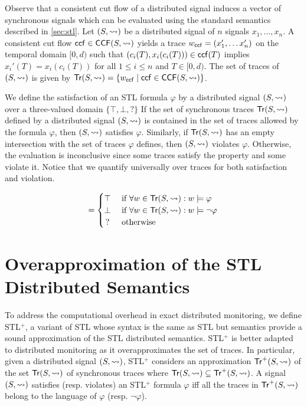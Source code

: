 Observe that a consistent cut flow of a distributed signal induces a vector of synchronous signals which can be evaluated using the standard semantics described in \cref{sec:stl}.
Let $(S,{\rightsquigarrow})$ be a distributed signal of $n$ signals $x_1, \ldots, x_n$.
A consistent cut flow $\mathsf{ccf} \in \mathsf{CCF}(S,{\rightsquigarrow})$ yields a trace $w_{\mathsf{ccf}} = (x'_1, \ldots x'_n)$ on the temporal domain $[0,d)$ such that $(c_i(T), x_i(c_i(T))) \in \mathsf{ccf}(T)$ implies $x_i'(T) = x_i(c_i(T))$ for all $1 \leq i \leq n$ and $T \in [0, d)$.
The set of traces of $(S,{\rightsquigarrow})$ is given by $\tr(S,{\hb}) = \{ w_{\ccf} \st \ccf \in \CCF(S,{\hb})\}$.

We define the satisfaction of an STL formula $\varphi$ by a distributed signal $(S,{\rightsquigarrow})$ over a three-valued domain $\{\top, \bot, {?}\}$
If the set of synchronous traces $\mathsf{Tr}(S,{\rightsquigarrow})$ defined by a distributed signal $(S,{\rightsquigarrow})$ is contained in the set of traces allowed by the formula $\varphi$, then $(S,{\rightsquigarrow})$ satisfies $\varphi$.
Similarly, if $\mathsf{Tr}(S,{\rightsquigarrow})$ has an empty intersection with the set of traces $\varphi$ defines, then $(S,{\rightsquigarrow})$ violates $\varphi$.
Otherwise, the evaluation is inconclusive since some traces satisfy the property and some violate it.
Notice that we quantify universally over traces for both satisfaction and violation.

\small
\begin{equation*}
	[(S,{\hb}) \models \varphi] = 
	\begin{cases}
		\top & \text{ if } \forall w \in \tr(S,{\hb}) : w \models \varphi \\
		\bot & \text{ if } \forall w \in \tr(S,{\hb}) : w \models \lnot\varphi \\
		\,? & \text{ otherwise}
	\end{cases}
\end{equation*}
\normalsize

\section{Overapproximation of the STL Distributed Semantics}
To address the computational overhead in exact distributed monitoring, we define STL$^+$, a variant of STL whose syntax is the same as STL but semantics provide a sound approximation of the STL distributed semantics.
STL$^+$ is better adapted to distributed monitoring as it overapproximates the set of traces.
In particular, given a distributed signal $(S,{\rightsquigarrow})$, STL$^+$ considers an approximation 
$\mathsf{Tr}^+(S,{\rightsquigarrow})$ of the set $\mathsf{Tr}(S,{\rightsquigarrow})$ of synchronous traces where $ \mathsf{Tr}(S,{\rightsquigarrow}) \subseteq \mathsf{Tr}^+(S,{\rightsquigarrow})$.
A signal $(S,{\rightsquigarrow})$ satisfies (resp. violates) an STL$^+$ formula $\varphi$ iff all the traces in $\mathsf{Tr}^+(S,{\rightsquigarrow})$ belong to the language of $\varphi$ (resp. $\lnot \varphi$).

